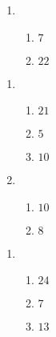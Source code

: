 \documentclass[12pt,twoside]{article}
\makeatletter
\def\emptycleardoublepage{\clearpage\if@twoside \ifodd\c@page\else
\thispagestyle{empty}%
\hbox{}\newpage\if@twocolumn\hbox{}\newpage\fi\fi\fi}
\makeatother
\begin{document}
\begin{multicols}{2}
\begin{enumerate}
\item \begin{enumerate}
\def \a{13}\def \dif{7}\def \b{6}
\item $\dif$
\def \a{6}\def \b{16}\def \apb{22}
\item $\apb$
\def \vshift{1}\def \hshift{4}\def \chang{-2}\def \findval{2}\def \yval{5}
\end{enumerate}
\end{enumerate}\end{multicols}\emptycleardoublepage{}\graphicspath{{C:/Users/iainc/anaconda3/Randomizer/Sample Course/Sample Assessment 2/}}\begin{multicols}{2} \begin{enumerate}
\item \begin{enumerate}
\def \a{6}\def \b{15}\def \apb{21}
\item $\apb$
\def \a{11}\def \dif{5}\def \b{6}
\item $\dif$
\def \a{4}\def \b{6}\def \ab{10}
\item $\ab$
\def \vshift{-3}\def \hshift{-4}\def \chang{-2}\def \findval{-6}\def \yval{1}
\end{enumerate}

\item \begin{enumerate}
\def \a{3}\def \b{7}\def \ab{10}
\item $\ab$
\def \a{13}\def \dif{8}\def \b{5}
\item $\dif$
\def \vshift{1}\def \hshift{-4}\def \chang{-2}\def \findval{-6}\def \yval{5}
\end{enumerate}
\end{enumerate}\end{multicols}\emptycleardoublepage{}\graphicspath{{C:/Users/iainc/anaconda3/Randomizer/Sample Course/Sample Assessment 2/}}\begin{multicols}{2} \begin{enumerate}
\item \begin{enumerate}
\def \a{6}\def \b{18}\def \apb{24}
\item $\apb$
\def \a{11}\def \dif{7}\def \b{4}
\item $\dif$
\def \a{5}\def \b{8}\def \ab{13}
\item $\ab$
\def \vshift{-1}\def \hshift{4}\def \chang{2}\def \findval{6}\def \yval{-5}
\end{enumerate}


\end{enumerate}
\end{multicols}
\end{document}
